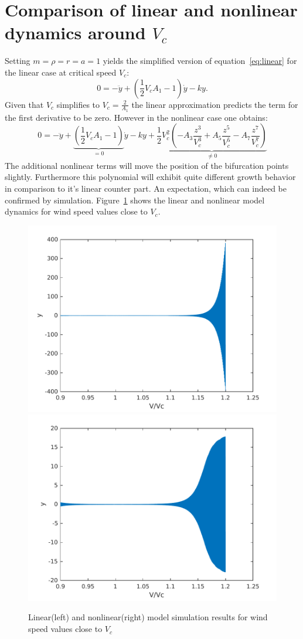 \section{Comparison of linear and nonlinear dynamics around $V_c$}
Setting $m=\rho=r=a=1$ yields the simplified version of equation~\ref{eq:linear} for the linear case at critical speed $V_c$:
\begin{equation}
0 = -\ddot{y} + (\frac{1}{2}V_c A_1 - 1 )\dot{y} - ky.
\end{equation}
Given that $V_c$ simplifies to $V_c = \frac{2}{A_1}$ the linear approximation predicts the term for the first derivative to be zero. However in the nonlinear case one obtains:
\begin{equation}
0 = -\ddot{y} + 
\underbrace{(\frac{1}{2}V_c A_1 - 1 )}_\text{$=0$} \dot{y}  - ky 
+ \underbrace{\frac{1}{2} V_c^2 (- A_3 \frac{z^3}{V_c^3} + A_5 \frac{z^5}{V_c^5} - A_7 \frac{z^7}{V_c^7})}_\text{$\ne 0$}
\end{equation}
The additional nonlinear terms will move the position of the bifurcation points slightly. Furthermore this polynomial will exhibit quite different growth behavior in comparison to it's linear counter part. An expectation, which can indeed be confirmed by simulation. Figure~\ref{fig:linNonLinVcSim} shows the linear and nonlinear model dynamics for wind speed values close to $V_c$.
\begin{figure}
\centering
\includegraphics[width=0.4\linewidth]{./plots/linearVcSim}
\includegraphics[width=0.4\linewidth]{./plots/nonLinearVcSim}
\caption{Linear(left) and nonlinear(right) model simulation results for wind speed values close to $V_c$}
\label{fig:linNonLinVcSim}
\end{figure}






